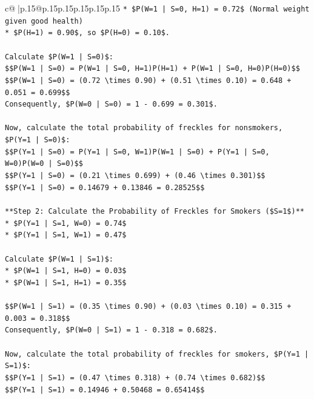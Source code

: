 \documentclass{article}
\begin{document}
{\begin{supertabular}{c@{$\;$}|p{.15\linewidth}@{}p{.15\linewidth}p{.15\linewidth}p{.15\linewidth}p{.15\linewidth}p{.15\linewidth}}
{{{\texttt{*   \$P(W=1 | S=0, H=1) = 0.72\$ (Normal weight given good health)} \\
\texttt{*   \$P(H=1) = 0.90\$, so \$P(H=0) = 0.10\$.} \\
\\ 
\texttt{Calculate \$P(W=1 | S=0)\$:} \\
\texttt{\$\$P(W=1 | S=0) = P(W=1 | S=0, H=1)P(H=1) + P(W=1 | S=0, H=0)P(H=0)\$\$} \\
\texttt{\$\$P(W=1 | S=0) = (0.72 \textbackslash{}times 0.90) + (0.51 \textbackslash{}times 0.10) = 0.648 + 0.051 = 0.699\$\$} \\
\texttt{Consequently, \$P(W=0 | S=0) = 1 {-} 0.699 = 0.301\$.} \\
\\ 
\texttt{Now, calculate the total probability of freckles for nonsmokers, \$P(Y=1 | S=0)\$:} \\
\texttt{\$\$P(Y=1 | S=0) = P(Y=1 | S=0, W=1)P(W=1 | S=0) + P(Y=1 | S=0, W=0)P(W=0 | S=0)\$\$} \\
\texttt{\$\$P(Y=1 | S=0) = (0.21 \textbackslash{}times 0.699) + (0.46 \textbackslash{}times 0.301)\$\$} \\
\texttt{\$\$P(Y=1 | S=0) = 0.14679 + 0.13846 = 0.28525\$\$} \\
\\ 
\texttt{**Step 2: Calculate the Probability of Freckles for Smokers (\$S=1\$)**} \\
\texttt{*   \$P(Y=1 | S=1, W=0) = 0.74\$} \\
\texttt{*   \$P(Y=1 | S=1, W=1) = 0.47\$} \\
\\ 
\texttt{Calculate \$P(W=1 | S=1)\$:} \\
\texttt{*   \$P(W=1 | S=1, H=0) = 0.03\$} \\
\texttt{*   \$P(W=1 | S=1, H=1) = 0.35\$} \\
\\ 
\texttt{\$\$P(W=1 | S=1) = (0.35 \textbackslash{}times 0.90) + (0.03 \textbackslash{}times 0.10) = 0.315 + 0.003 = 0.318\$\$} \\
\texttt{Consequently, \$P(W=0 | S=1) = 1 {-} 0.318 = 0.682\$.} \\
\\ 
\texttt{Now, calculate the total probability of freckles for smokers, \$P(Y=1 | S=1)\$:} \\
\texttt{\$\$P(Y=1 | S=1) = (0.47 \textbackslash{}times 0.318) + (0.74 \textbackslash{}times 0.682)\$\$} \\
\texttt{\$\$P(Y=1 | S=1) = 0.14946 + 0.50468 = 0.65414\$\$} \\
}}}
\end{supertabular}}
\end{document}
